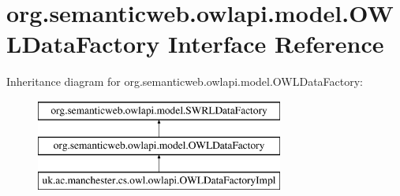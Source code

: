 \hypertarget{interfaceorg_1_1semanticweb_1_1owlapi_1_1model_1_1_o_w_l_data_factory}{\section{org.\-semanticweb.\-owlapi.\-model.\-O\-W\-L\-Data\-Factory Interface Reference}
\label{interfaceorg_1_1semanticweb_1_1owlapi_1_1model_1_1_o_w_l_data_factory}
}
Inheritance diagram for org.\-semanticweb.\-owlapi.\-model.\-O\-W\-L\-Data\-Factory\-:\begin{figure}[H]
\begin{center}
\leavevmode
\includegraphics[height=3.000000cm]{interfaceorg_1_1semanticweb_1_1owlapi_1_1model_1_1_o_w_l_data_factory}
\end{center}
\end{figure}
